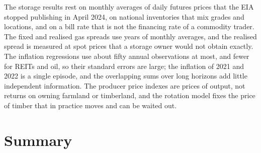 \begin{chapterrefs}
The storage results rest on monthly averages of daily futures prices that the EIA stopped publishing in
April 2024, on national inventories that mix grades and locations, and on a bill rate that is not the
financing rate of a commodity trader. The fixed and realised gas spreads use \sgLockN{} years of monthly averages, and the realised spread
is measured at spot prices that a storage owner would not obtain exactly. The inflation regressions use
about fifty annual observations at most, and fewer for REITs and oil, so their standard errors are large; the inflation of 2021 and 2022 is a
single episode, and the overlapping sums over long horizons add little independent information. The producer price indexes are prices of output, not returns on owning farmland or
timberland, and the rotation model fixes the price of timber that in practice moves and can be waited out.

\FloatBarrier
\section{Summary}
\label{sec10:summary}


\end{chapterrefs}
